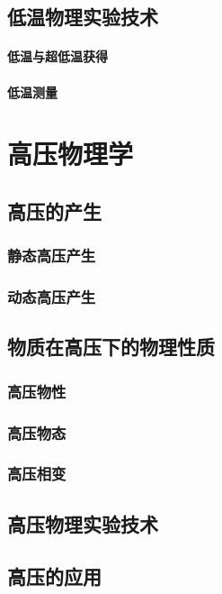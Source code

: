 \documentclass[UTF8]{../06-Physics}
\begin{document}
\section{低温物理实验技术}
    \subsubsection{低温与超低温获得}
    \subsubsection{低温测量}






\chapter{高压物理学}
\section{高压的产生}
    \subsection{静态高压产生}
    \subsection{动态高压产生}

\section{物质在高压下的物理性质}
    \subsection{高压物性}
    \subsection{高压物态}
    \subsection{高压相变}

\section{高压物理实验技术}
\section{高压的应用}
\end{document}
